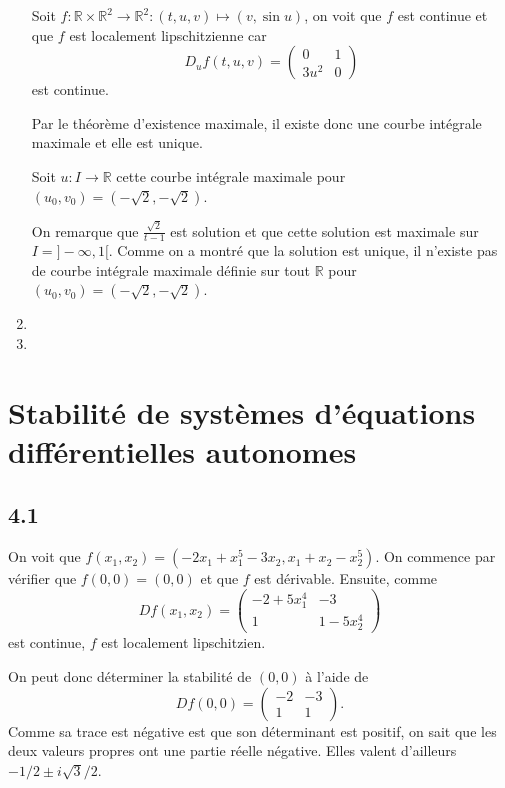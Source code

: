 \documentclass{article}
\begin{document}
\begin{enumerate}
    Soit $f:\mathbb{R}\times\mathbb{R}^2\to\mathbb{R}^2:
    (t,u,v)\mapsto(v,\sin u)$, on voit que $f$ est continue et que
    $f$ est localement lipschitzienne car
    \[ D_uf(t,u,v) =
      \begin{pmatrix}
        0 & 1\\
        3u^2 & 0
    \end{pmatrix} \]
    est continue.

    Par le théorème d'existence maximale, il existe donc une courbe intégrale
    maximale et elle est unique.

    Soit $u:I\to\mathbb{R}$ cette courbe intégrale maximale pour
    $(u_0,v_0) = (-\sqrt{2},-\sqrt{2})$.

    On remarque que $\frac{\sqrt{2}}{t-1}$ est solution et que cette solution
    est maximale sur $I = ]-\infty,1[$.
    Comme on a montré que la solution est unique,
    il n'existe pas de courbe intégrale maximale définie sur tout $\mathbb{R}$
    pour $(u_0,v_0) = (-\sqrt{2},-\sqrt{2})$.
  \item
  \item
\end{enumerate}

\section{Stabilité de systèmes d'équations différentielles autonomes}

\subsection*{4.1}
On voit que $f(x_1,x_2) = (-2x_1 + x_1^5 - 3x_2, x_1 + x_2 - x_2^5)$.
On commence par vérifier que $f(0,0) = (0,0)$ et que $f$ est dérivable.
Ensuite, comme
\[ Df(x_1,x_2) =
\begin{pmatrix}
  -2 + 5x_1^4 & -3\\
  1 & 1 - 5x_2^4
\end{pmatrix} \]
est continue, $f$ est localement lipschitzien.

On peut donc déterminer la stabilité de $(0,0)$ à l'aide de
\[ Df(0, 0) =
\begin{pmatrix}
  -2 & -3\\
  1 & 1
\end{pmatrix}. \]
Comme sa trace est négative est que son déterminant est positif,
on sait que les deux valeurs propres ont une partie réelle négative.
Elles valent d'ailleurs $-1/2 \pm i\sqrt{3}/2$.
\end{document}
